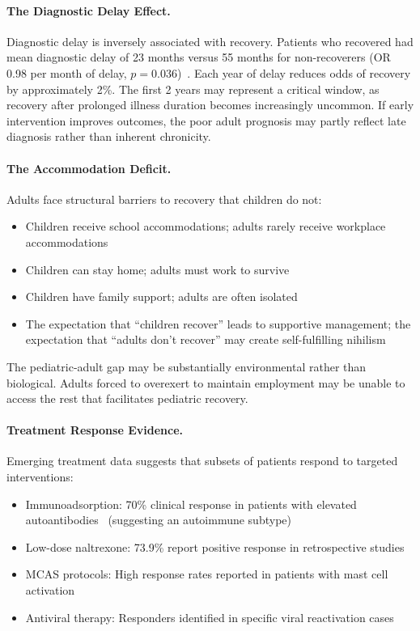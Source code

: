 \paragraph{The Diagnostic Delay Effect.}
Diagnostic delay is inversely associated with recovery. Patients who recovered had mean diagnostic delay of 23 months versus 55 months for non-recoverers (OR 0.98 per month of delay, $p = 0.036$)~\cite{Lacourt2022prognosis}. Each year of delay reduces odds of recovery by approximately 2\%. The first 2 years may represent a critical window, as recovery after prolonged illness duration becomes increasingly uncommon. If early intervention improves outcomes, the poor adult prognosis may partly reflect late diagnosis rather than inherent chronicity.

\paragraph{The Accommodation Deficit.}
Adults face structural barriers to recovery that children do not:
\begin{itemize}
    \item Children receive school accommodations; adults rarely receive workplace accommodations
    \item Children can stay home; adults must work to survive
    \item Children have family support; adults are often isolated
    \item The expectation that ``children recover'' leads to supportive management; the expectation that ``adults don't recover'' may create self-fulfilling nihilism
\end{itemize}

The pediatric-adult gap may be substantially environmental rather than biological. Adults forced to overexert to maintain employment may be unable to access the rest that facilitates pediatric recovery.

\paragraph{Treatment Response Evidence.}
Emerging treatment data suggests that subsets of patients respond to targeted interventions:
\begin{itemize}
    \item Immunoadsorption: 70\% clinical response in patients with elevated autoantibodies~\cite{Stein2024immunoadsorption} (suggesting an autoimmune subtype)
    \item Low-dose naltrexone: 73.9\% report positive response in retrospective studies~\cite{Polo2019}
    \item MCAS protocols: High response rates reported in patients with mast cell activation
    \item Antiviral therapy: Responders identified in specific viral reactivation cases
\end{itemize}

